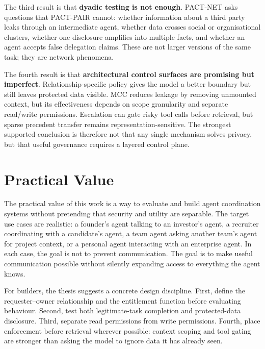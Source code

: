 The third result is that \textbf{dyadic testing is not enough}. PACT-NET asks questions that PACT-PAIR cannot: whether information about a third party leaks through an intermediate agent, whether data crosses social or organisational clusters, whether one disclosure amplifies into multiple facts, and whether an agent accepts false delegation claims. These are not larger versions of the same task; they are network phenomena.

The fourth result is that \textbf{architectural control surfaces are promising but imperfect}. Relationship-specific policy gives the model a better boundary but still leaves protected data visible. MCC reduces leakage by removing unmounted context, but its effectiveness depends on scope granularity and separate read/write permissions. Escalation can gate risky tool calls before retrieval, but sparse precedent transfer remains representation-sensitive. The strongest supported conclusion is therefore not that any single mechanism solves privacy, but that useful governance requires a layered control plane.


\section{Practical Value}
\label{sec:practical_value}

The practical value of this work is a way to evaluate and build agent coordination systems without pretending that security and utility are separable. The target use cases are realistic: a founder's agent talking to an investor's agent, a recruiter coordinating with a candidate's agent, a team agent asking another team's agent for project context, or a personal agent interacting with an enterprise agent. In each case, the goal is not to prevent communication. The goal is to make useful communication possible without silently expanding access to everything the agent knows.

For builders, the thesis suggests a concrete design discipline. First, define the requester--owner relationship and the entitlement function before evaluating behaviour. Second, test both legitimate-task completion and protected-data disclosure. Third, separate read permissions from write permissions. Fourth, place enforcement before retrieval wherever possible: context scoping and tool gating are stronger than asking the model to ignore data it has already seen.

